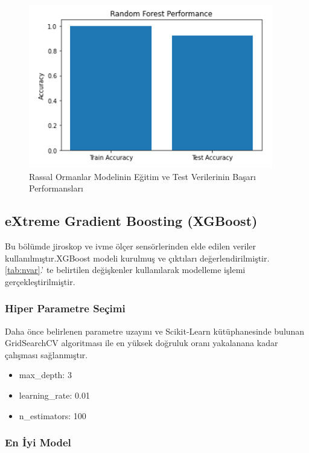 \documentclass[12pt,twoside]{deuthesis}
\providecommand{\tightlist}{%
  \setlength{\itemsep}{0pt}\setlength{\parskip}{0pt}}
\begin{document}
\begin{figure}

{\centering \includegraphics[width=0.6\linewidth,height=0.25\textheight]{figure/ji_random_forest_testtrain} 

}

\caption{Rassal Ormanlar Modelinin Eğitim ve Test Verilerinin Başarı Performansları}\label{fig:jirandomforesttesttrain}
\end{figure}
\hypertarget{extreme-gradient-boosting-xgboost-2}{%
\subsection{eXtreme Gradient Boosting (XGBoost)}\label{extreme-gradient-boosting-xgboost-2}}

Bu bölümde jiroskop ve ivme ölçer sensörlerinden elde edilen veriler kullanılmıştır.XGBoost modeli kurulmuş ve çıktıları değerlendirilmiştir. \ref{tab:nvar}.' te belirtilen değişkenler kullanılarak modelleme işlemi gerçekleştirilmiştir.

\hypertarget{hiper-parametre-seuxe7imi-10}{%
\subsubsection{Hiper Parametre Seçimi}\label{hiper-parametre-seuxe7imi-10}}

Daha önce belirlenen parametre uzayını ve Scikit-Learn kütüphanesinde bulunan GridSearchCV algoritması ile en yüksek doğruluk oranı yakalanana kadar çalışması sağlanmıştır.
\begin{itemize}
\tightlist
\item
  max\_depth: 3
\item
  learning\_rate: 0.01
\item
  n\_estimators: 100
\end{itemize}
\hypertarget{en-iyi-model-12}{%
\subsubsection{En İyi Model}\label{en-iyi-model-12}}
\end{document}
